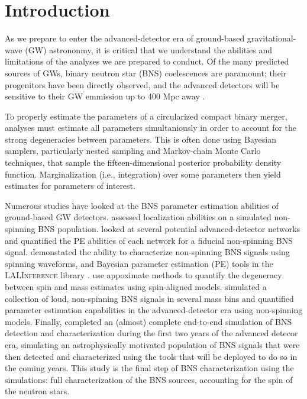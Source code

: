 \section{Introduction}

As we prepare to enter the advanced-detector era of ground-based gravitational-wave (GW) astrononmy, it is critical that we understand the abilities and limitations of the analyses we are prepared to conduct.  Of the many predicted sources of GWs, binary neutron star (BNS) coelescences are paramount; their progenitors have been directly observed, and the advanced detectors will be sensitive to their GW emmission up to 400 Mpc away \cite{2013arXiv1304.0670L}.

To properly estimate the parameters of a circularized compact binary merger, analyses must estimate all parameters simultaniously in order to account for the strong degeneracies between parameters.  This is often done using Bayesian samplers, particularly nested sampling \cite{Veitch_2010} and Markov-chain Monte Carlo \cite{Christensen_2003,R_ver_2006,van_der_Sluys_2008} techniques, that sample the fifteen-dimensional posterior probability density function.  Marginalization (i.e., integration) over some parameters then yield estimates for parameters of interest.

Numerous studies have looked at the BNS parameter estimation abilities of ground-based GW detectors. \citet{Nissanke_2010,Nissanke_2011} assessed localization abilities on a simulated non-spinning BNS population.  \citet{Veitch_2012} looked at several potential advanced-detector networks and quantified the PE abilities of each network for a fiducial non-spinning BNS signal.  \citet{Aasi_2013} demonstated the ability to characterize non-spinning BNS signals using spinning waveforms, and Bayesian parameter estimation (PE) tools in the \textsc{LALInference} library \cite{Veitch_2014}.   \citet{Hannam_2013} use appoximate methods to quantify the degeneracy between spin and mass estimates using spin-aligned models.  \citet{Rodriguez_2014} simulated a collection of loud, non-spinning BNS signals in several mass bins and quantified parameter estimation capabilities in the advanced-detector era using non-spinning models.  Finally, \citet{Singer_2014} completed an (almost) complete end-to-end simulation of BNS detection and characterization during the first two years of the advanced detecor era, simulating an astrophysically motivated population of BNS signals that were then detected and characterized using the tools that will be deployed to do so in the coming years.  This study is the final step of BNS characterization using the \citet{Singer_2014} simulations: full characterization of the BNS sources, accounting for the spin of the neutron stars.